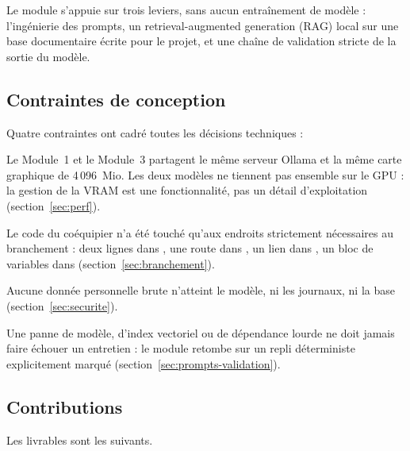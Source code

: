 Le module s'appuie sur trois leviers, sans aucun entraînement de modèle :
l'ingénierie des prompts, un retrieval-augmented generation (RAG) local sur une
base documentaire écrite pour le projet, et une chaîne de validation stricte de
la sortie du modèle.

\subsection{Contraintes de conception}

Quatre contraintes ont cadré toutes les décisions techniques :

\begin{description}[leftmargin=1.4em,itemsep=2pt,topsep=3pt,style=nextline]
  \item[Coexistence matérielle.] Le Module~1 et le Module~3 partagent le même
    serveur Ollama et la même carte graphique de 4\,096~Mio. Les deux modèles
    ne tiennent pas ensemble sur le GPU : la gestion de la VRAM est une
    fonctionnalité, pas un détail d'exploitation (section~\ref{sec:perf}).
  \item[Non-régression du Module~1.] Le code du coéquipier n'a été touché
    qu'aux endroits strictement nécessaires au branchement : deux lignes dans
    , une route dans , un lien dans
    , un bloc de variables dans 
    (section~\ref{sec:branchement}).
  \item[Confidentialité par construction.] Aucune donnée personnelle brute
    n'atteint le modèle, ni les journaux, ni la base (section~\ref{sec:securite}).
  \item[Dégradation contrôlée.] Une panne de modèle, d'index vectoriel ou de
    dépendance lourde ne doit jamais faire échouer un entretien : le module
    retombe sur un repli déterministe explicitement marqué
     (section~\ref{sec:prompts-validation}).
\end{description}

\subsection{Contributions}

Les livrables sont les suivants.

